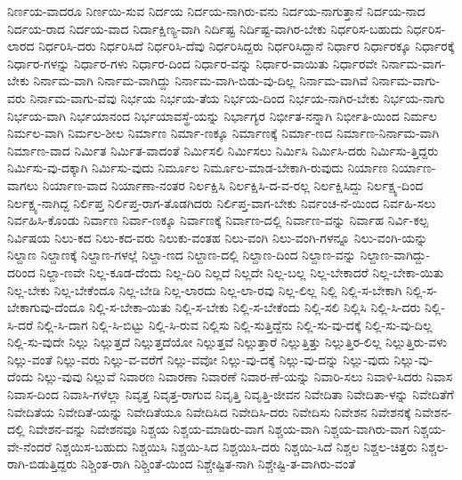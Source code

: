 {ನಿರ್ಣಯ-ವಾದರೂ
ನಿರ್ಣಯಿ-ಸುವ
ನಿರ್ದಯ
ನಿರ್ದಯ-ನಾಗಿರು-ವನು
ನಿರ್ದಯ-ನಾಗುತ್ತಾನೆ
ನಿರ್ದಯ-ನಾದ
ನಿರ್ದಯ-ರಾದ
ನಿರ್ದಯ-ವಾದ
ನಿರ್ದಾಕ್ಷಿಣ್ಯ-ವಾಗಿ
ನಿರ್ದಿಷ್ಟ
ನಿರ್ದಿಷ್ಟ-ವಾಗಿರ-ಬೇಕು
ನಿರ್ಧರಿಸ-ಬಹುದು
ನಿರ್ಧರಿಸ-ಲಾರದ
ನಿರ್ಧರಿಸಿ-ದರು
ನಿರ್ಧರಿಸಿದೆ
ನಿರ್ಧರಿಸಿ-ದೆವು
ನಿರ್ಧರಿಸಿದ್ದರು
ನಿರ್ಧರಿಸಿದ್ದಾನೆ
ನಿರ್ಧಾರ
ನಿರ್ಧಾರಕ್ಕೂ
ನಿರ್ಧಾರಕ್ಕೆ
ನಿರ್ಧಾರ-ಗಳನ್ನು
ನಿರ್ಧಾರ-ಗಳು
ನಿರ್ಧಾರ-ದಿಂದ
ನಿರ್ಧಾರ-ವನ್ನು
ನಿರ್ಧಾರ-ವಾಯಿತು
ನಿರ್ಧಾರವೇ
ನಿರ್ನಾಮ-ವಾಗ-ಬೇಕು
ನಿರ್ನಾಮ-ವಾಗಿ
ನಿರ್ನಾಮ-ವಾಗಿದ್ದು
ನಿರ್ನಾಮ-ವಾಗಿ-ಬಿಡು-ವು-ದಿಲ್ಲ
ನಿರ್ನಾಮ-ವಾಗಿವೆ
ನಿರ್ನಾಮ-ವಾಗು-ವರು
ನಿರ್ನಾಮ-ವಾಗು-ವೆವು
ನಿರ್ಭಯ
ನಿರ್ಭಯ-ತೆಯ
ನಿರ್ಭಯ-ದಿಂದ
ನಿರ್ಭಯ-ನಾಗಿರ-ಬೇಕು
ನಿರ್ಭಯ-ನಾಗು
ನಿರ್ಭಯ-ವಾಗಿ
ನಿರ್ಭಯಾನಂದ
ನಿರ್ಭಯಾವಸ್ಥೆ-ಯನ್ನು
ನಿರ್ಭಾಗ್ಯರ
ನಿರ್ಭೀತ-ನನ್ನಾಗಿ
ನಿರ್ಭೀತಿ-ಯಿಂದ
ನಿರ್ಮಲ
ನಿರ್ಮಲ-ವಾಗಿ
ನಿರ್ಮಲ-ಶೀಲ
ನಿರ್ಮಾಣ
ನಿರ್ಮಾ-ಣಕ್ಕೂ
ನಿರ್ಮಾಣಕ್ಕೆ
ನಿರ್ಮಾ-ಣದ
ನಿರ್ಮಾಣ-ನಿರ್ನಾಮ-ವಾಗಿ
ನಿರ್ಮಾಣ-ವಾದ
ನಿರ್ಮಿತ
ನಿರ್ಮಿತ-ವಾದಂತೆ
ನಿರ್ಮಿಸಲಿ
ನಿರ್ಮಿಸಲು
ನಿರ್ಮಿಸಿ
ನಿರ್ಮಿಸಿ-ದರು
ನಿರ್ಮಿಸು-ತ್ತಿದ್ದರು
ನಿರ್ಮಿಸು-ವು-ದಕ್ಕಾಗಿ
ನಿರ್ಮಿಸು-ವುದು
ನಿರ್ಮೂಲ
ನಿರ್ಮೂಲ-ಮಾಡ-ಬೇಕಾಗಿ-ರುವುದು
ನಿರ್ಯಾಣ
ನಿರ್ಯಾಣ-ವಾಗಲು
ನಿರ್ಯಾಣ-ವಾದ
ನಿರ್ಯಾಣಾ-ನಂತರ
ನಿರ್ಲಕ್ಷಿಸಿ
ನಿರ್ಲಕ್ಷಿಸಿ-ದ-ವ-ರಲ್ಲ
ನಿರ್ಲಕ್ಷಿಸಿದ್ದು
ನಿರ್ಲಕ್ಷ್ಯ-ದಿಂದ
ನಿರ್ಲಕ್ಷ್ಯ-ನಾಗಿದ್ದ
ನಿರ್ಲಿಪ್ತ
ನಿರ್ಲಿಪ್ತ-ರಾಗ-ತೊಡಗಿದರು
ನಿರ್ಲಿಪ್ತ-ವಾಗ-ಬೇಕು
ನಿರ್ವಂಚ-ನೆ-ಯಿಂದ
ನಿರ್ವಹಿ-ಸಲು
ನಿರ್ವಹಿಸಿ-ಕೊಂಡು
ನಿರ್ವಾಣ
ನಿರ್ವಾ-ಣಕ್ಕೂ
ನಿರ್ವಾಣಕ್ಕೆ
ನಿರ್ವಾಣ-ದಲ್ಲಿ
ನಿರ್ವಾಣ-ವನ್ನು
ನಿರ್ವಾಹ
ನಿರ್ವಿ-ಕಲ್ಪ
ನಿರ್ವಿಷಯ
ನಿಲು-ಕದ
ನಿಲು-ಕದ-ವರು
ನಿಲುಕು-ವಂತಹ
ನಿಲು-ವಂಗಿ
ನಿಲು-ವಂಗಿ-ಗಳನ್ನೂ
ನಿಲು-ವಂಗಿ-ಯನ್ನು
ನಿಲ್ದಾಣ
ನಿಲ್ದಾಣಕ್ಕೆ
ನಿಲ್ದಾಣ-ಗಳಲ್ಲೆ
ನಿಲ್ದಾ-ಣದ
ನಿಲ್ದಾಣ-ದಲ್ಲಿ
ನಿಲ್ದಾಣ-ದಿಂದ
ನಿಲ್ದಾಣ-ವನ್ನು
ನಿಲ್ದಾಣ-ವಾಗಿದ್ದು-ದರಿಂದ
ನಿಲ್ದಾ-ಣವೇ
ನಿಲ್ಲ-ಕೂಡ-ದೆಂದು
ನಿಲ್ಲ-ದಿರಿ
ನಿಲ್ಲದೆ
ನಿಲ್ಲದೇ
ನಿಲ್ಲ-ಬಲ್ಲ
ನಿಲ್ಲ-ಬೇಕಾದರೆ
ನಿಲ್ಲ-ಬೇಕಾ-ಯಿತು
ನಿಲ್ಲ-ಬೇಕು
ನಿಲ್ಲ-ಬೇಕೆಂದೂ
ನಿಲ್ಲ-ಬೇಡಿ
ನಿಲ್ಲ-ಲಾರದು
ನಿಲ್ಲ-ಲಾ-ರವು
ನಿಲ್ಲ-ಲಿಲ್ಲ
ನಿಲ್ಲಿ
ನಿಲ್ಲಿ-ಸ-ಬೇಕಾಗಿ
ನಿಲ್ಲಿ-ಸ-ಬೇಕಾಗುವು-ದೆಂದೂ
ನಿಲ್ಲಿ-ಸ-ಬೇಕಾ-ಯಿತು
ನಿಲ್ಲಿ-ಸ-ಬೇಕು
ನಿಲ್ಲಿ-ಸ-ಬೇಕೆಂದು
ನಿಲ್ಲಿ-ಸಲಿ
ನಿಲ್ಲಿಸಿ
ನಿಲ್ಲಿ-ಸಿ-ದರು
ನಿಲ್ಲಿ-ಸಿ-ದರೆ
ನಿಲ್ಲಿ-ಸಿ-ದಾಗ
ನಿಲ್ಲಿ-ಸಿ-ಬಿಟ್ಟು
ನಿಲ್ಲಿ-ಸಿ-ರುವ
ನಿಲ್ಲಿಸು
ನಿಲ್ಲಿ-ಸುತ್ತಿದ್ದೆನು
ನಿಲ್ಲಿ-ಸು-ವು-ದಕ್ಕೆ
ನಿಲ್ಲಿ-ಸು-ವು-ದಿಲ್ಲ
ನಿಲ್ಲಿ-ಸು-ವುದೇ
ನಿಲ್ಲು
ನಿಲ್ಲುತ್ತದೆ
ನಿಲ್ಲುತ್ತದೆಯೋ
ನಿಲ್ಲುತ್ತವೆ
ನಿಲ್ಲುತ್ತಾರೆ
ನಿಲ್ಲುತ್ತಿತ್ತು
ನಿಲ್ಲುತ್ತಿರ-ಲಿಲ್ಲ
ನಿಲ್ಲುತ್ತಿರು-ವಳು
ನಿಲ್ಲು-ವಂತೆ
ನಿಲ್ಲು-ವರು
ನಿಲ್ಲು-ವ-ವರೆಗೆ
ನಿಲ್ಲು-ವವೋ
ನಿಲ್ಲು-ವು-ದಕ್ಕೆ
ನಿಲ್ಲು-ವು-ದನ್ನು
ನಿಲ್ಲು-ವುದು
ನಿಲ್ಲು-ವು-ದೆಂದು
ನಿಲ್ಲು-ವುವು
ನಿಲ್ಲುವೆ
ನಿವಾರಣ
ನಿವಾರಣಾ
ನಿವಾರಣೆ
ನಿವಾರ-ಣೆ-ಯನ್ನು
ನಿವಾರಿ-ಸಲು
ನಿವಾಳಿ-ಸಿದರು
ನಿವಾಸ
ನಿವಾಸ-ದಿಂದ
ನಿವಾಸಿ-ಗಳೆಲ್ಲಾ
ನಿವೃತ್ತ
ನಿವೃತ್ತ-ರಾಗುವ
ನಿವೃತ್ತಿ
ನಿವೃತ್ತಿ-ಜೀವನ
ನಿವೇದಿತಾ
ನಿವೇದಿತಾ-ಳನ್ನು
ನಿವೇದಿತೆಗೆ
ನಿವೇದಿತೆಯ
ನಿವೇದಿತೆ-ಯನ್ನು
ನಿವೇದಿತೆಯೂ
ನಿವೇದಿಸಿದ
ನಿವೇದಿಸಿ-ದರು
ನಿವೇದಿಸು
ನಿವೇಶನ
ನಿವೇಶನಕ್ಕೆ
ನಿವೇಶನ-ದಲ್ಲಿ
ನಿವೇಶನ-ವನ್ನು
ನಿವೇಶನವೂ
ನಿಶ್ಚಯ
ನಿಶ್ಚಯ-ಮಾಡಿರು-ವಾಗ
ನಿಶ್ಚಯ-ವಾಗಿ
ನಿಶ್ಚಯ-ವಾಗಿರು-ವಾಗ
ನಿಶ್ಚಯ-ವೇ-ನೆಂದರೆ
ನಿಶ್ಚಯಿಸ-ಬಹುದು
ನಿಶ್ಚಯಿಸಿ
ನಿಶ್ಚಯಿ-ಸಿದ
ನಿಶ್ಚಯಿಸಿ-ದರು
ನಿಶ್ಚಯಿ-ಸಿದೆ
ನಿಶ್ಚಲ
ನಿಶ್ಚಲ-ಚಿತ್ತರು
ನಿಶ್ಚಲ-ರಾಗಿ-ಬಿಡುತ್ತಿದ್ದರು
ನಿಶ್ಚಿಂತ-ರಾಗಿ
ನಿಶ್ಚಿಂತೆ-ಯಿಂದ
ನಿಶ್ಚೇಷ್ಟಿತ-ನಾಗಿ
ನಿಶ್ಚೇಷ್ಟಿ-ತ-ವಾಗಿರು-ವಂತೆ
}
